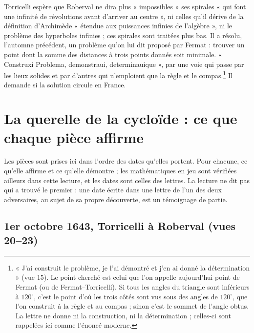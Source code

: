 \documentclass[11pt,a4paper]{article}
\begin{document}
Torricelli espère que Roberval ne dira plus « impossibles » ses spirales « qui
font une infinité de révolutions avant d'arriver au centre », ni celles qu'il
dérive de la définition d'Archimède « étendue aux puissances infinies de
l'algèbre », ni le problème des hyperboles infinies ; ces spirales sont
traitées plus bas. Il a résolu, l'automne précédent, un problème qu'on lui dit
proposé par Fermat : trouver un point dont la somme des distances à trois points
donnés soit minimale. « Construxi Problema, demonstraui, determinauique », par
une voie qui passe par les lieux solides et par d'autres qui n'emploient que la
règle et le compas.\footnote{« J'ai construit le problème, je l'ai démontré et
j'en ai donné la détermination » (vue 15). Le point cherché est celui que l'on
appelle aujourd'hui point de Fermat (ou de Fermat--Torricelli). Si tous les
angles du triangle sont inférieurs à $120^\circ$, c'est le point d'où les trois
côtés sont vus sous des angles de $120^\circ$, que l'on construit à la règle et
au compas ; sinon c'est le sommet de l'angle obtus. La lettre ne donne ni la
construction, ni la détermination ; celles-ci sont rappelées ici comme
l'énoncé moderne.} Il demande si la solution circule en France.

\section*{La querelle de la cycloïde : ce que chaque pièce affirme}

Les pièces sont prises ici dans l'ordre des dates qu'elles portent. Pour chacune,
ce qu'elle affirme et ce qu'elle démontre ; les mathématiques en jeu sont
vérifiées ailleurs dans cette lecture, et les dates sont celles des lettres. La
lecture ne dit pas qui a trouvé le premier : une date écrite dans une lettre de
l'un des deux adversaires, au sujet de sa propre découverte, est un témoignage
de partie.

\subsection*{1er octobre 1643, Torricelli à Roberval (vues 20--23)}
\end{document}
